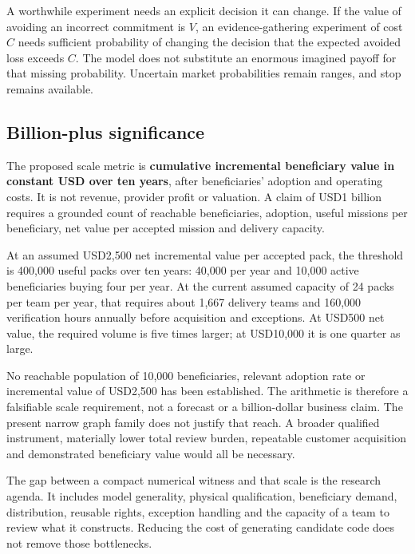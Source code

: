 \documentclass[
  11pt,
]{article}
\begin{document}
A worthwhile experiment needs an explicit decision it can change. If the
value of avoiding an incorrect commitment is \(V\), an
evidence-gathering experiment of cost \(C\) needs sufficient probability
of changing the decision that the expected avoided loss exceeds \(C\).
The model does not substitute an enormous imagined payoff for that
missing probability. Uncertain market probabilities remain ranges, and
stop remains available.

\hypertarget{billion-plus-significance}{%
\subsection{Billion-plus significance}\label{billion-plus-significance}}

The proposed scale metric is \textbf{cumulative incremental beneficiary
value in constant USD over ten years}, after beneficiaries' adoption and
operating costs. It is not revenue, provider profit or valuation. A
claim of USD1 billion requires a grounded count of reachable
beneficiaries, adoption, useful missions per beneficiary, net value per
accepted mission and delivery capacity.

At an assumed USD2,500 net incremental value per accepted pack, the
threshold is 400,000 useful packs over ten years: 40,000 per year and
10,000 active beneficiaries buying four per year. At the current assumed
capacity of 24 packs per team per year, that requires about 1,667
delivery teams and 160,000 verification hours annually before
acquisition and exceptions. At USD500 net value, the required volume is
five times larger; at USD10,000 it is one quarter as large.

No reachable population of 10,000 beneficiaries, relevant adoption rate
or incremental value of USD2,500 has been established. The arithmetic is
therefore a falsifiable scale requirement, not a forecast or a
billion-dollar business claim. The present narrow graph family does not
justify that reach. A broader qualified instrument, materially lower
total review burden, repeatable customer acquisition and demonstrated
beneficiary value would all be necessary.

The gap between a compact numerical witness and that scale is the
research agenda. It includes model generality, physical qualification,
beneficiary demand, distribution, reusable rights, exception handling
and the capacity of a team to review what it constructs. Reducing the
cost of generating candidate code does not remove those bottlenecks.
\end{document}
